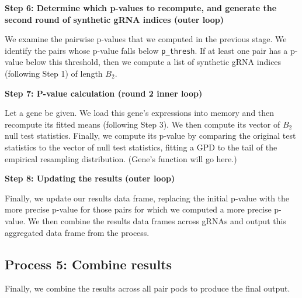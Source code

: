 \documentclass[12pt]{article}
\begin{document}
\begin{center}
	\textbf{Step 6: Determine which p-values to recompute, and generate the second round of synthetic gRNA indices (outer loop)}
\end{center}

We examine the pairwise p-values that we computed in the previous stage. We identify the pairs whose p-value falls below \texttt{p\_thresh}. If at least one pair has a p-value below this threshold, then we compute a list of synthetic gRNA indices (following Step 1) of length $B_2$. 

\begin{center}
	\textbf{Step 7: P-value calculation (round 2 inner loop)}
\end{center}

Let a gene be given. We load this gene's expressions into memory and then recompute its fitted means (following Step 3). We then compute its vector of $B_2$ null test statistics. Finally, we compute its p-value by comparing the original test statistics to the vector of null test statistics, fitting a GPD to the tail of the empirical resampling distribution. (Gene's function will go here.)

\begin{center}
	\textbf{Step 8: Updating the results (outer loop)}
\end{center}

Finally, we update our results data frame, replacing the initial p-value with the more precise p-value for those pairs for which we computed a more precise p-value. We then combine the results data frames across gRNAs and output this aggregated data frame from the process.

\subsection*{Process 5: Combine results}

Finally, we combine the results across all pair pods to produce the final output.



\end{document}
